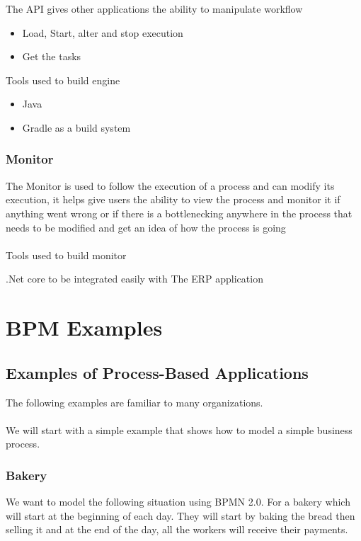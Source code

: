 The API gives other applications the ability to manipulate workflow
\begin{itemize}
    \item Load, Start, alter and stop execution
    \item Get the tasks
\end{itemize}

Tools used to build engine
\begin{itemize}
    \item Java
    \item Gradle as a build system
\end{itemize}


\subsection{Monitor}

The Monitor is used to follow the execution of a process and can modify its execution, it helps give
users the ability to view the process and monitor it if anything went wrong or if there is a
bottlenecking anywhere in the process that needs to be modified and get an idea of how the process is
going\\\\
Tools used to build monitor
\begin{adjustwidth}{2cm}{}
    .Net core to be integrated easily with The ERP application\\
\end{adjustwidth}

\chapter{BPM Examples}

\section{Examples of Process-Based Applications}
The following examples are familiar to many organizations.\\\\
We will start with a simple example that shows how to model a simple business process.

\subsection{Bakery}
We want to model the following situation using BPMN 2.0. For a bakery which will start at the
beginning of each day. They will start by baking the bread then selling it and at the end of the day, all
the workers will receive their payments.

